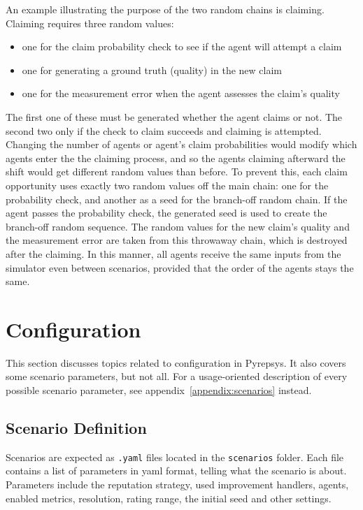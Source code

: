 \documentclass[%
    ]{\PathToTumTemplate/thesis/tum_thesis}
\begin{document}
An example illustrating the purpose of the two random chains is claiming.
Claiming requires three random values: 
\begin{itemize}
	\item one for the claim probability check to see if the agent will attempt a claim
	\item one for generating a ground truth (quality) in the new claim
	\item one for the measurement error when the agent assesses the claim's quality
\end{itemize}
The first one of these must be generated whether the agent claims or not.
The second two only if the check to claim succeeds and claiming is attempted.
Changing the number of agents or agent's claim probabilities would modify which agents enter the the claiming process, and so the agents claiming afterward the shift would get different random values than before.
To prevent this, each claim opportunity uses exactly two random values off the main chain: one for the probability check, and another as a seed for the branch-off random chain.
If the agent passes the probability check, the generated seed is used to create the branch-off random sequence.
The random values for the new claim's quality and the measurement error are taken from this throwaway chain, which is destroyed after the claiming.
In this manner, all agents receive the same inputs from the simulator even between scenarios, provided that the order of the agents stays the same.



\section{Configuration}\label{sec:impl_config}

This section discusses topics related to configuration in Pyrepsys.
It also covers some scenario parameters, but not all.
For a usage-oriented description of every possible scenario parameter, see appendix~\ref{appendix:scenarios} instead.


\subsection{Scenario Definition}
Scenarios are expected as \texttt{.yaml} files located in the \texttt{scenarios} folder.
Each file contains a list of parameters in yaml format, telling what the scenario is about.
Parameters include the reputation strategy, used improvement handlers, agents, enabled metrics, resolution, rating range, the initial seed and other settings.
\end{document}
